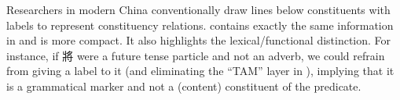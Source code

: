 \documentclass[UTF8, a4paper, oneside, scheme=plain, 12pt]{ctexrep}
\begin{document}
\begin{figure}[H]

\end{figure}

Researchers in modern China conventionally draw lines below constituents with labels to represent constituency relations.
 contains exactly the same information in  and is more compact.
It also highlights the lexical/functional distinction.
For instance, if 將 were a future tense particle and not an adverb,
we could refrain from giving a label to it (and eliminating the ``TAM'' layer in ),
implying that it is a grammatical marker and not a (content) constituent of the predicate.
\end{document}
